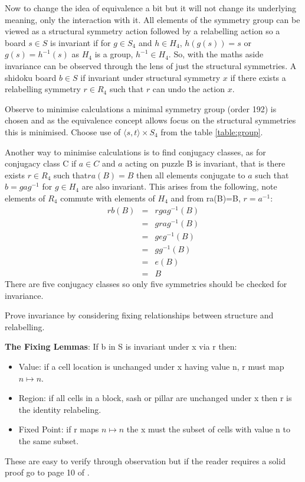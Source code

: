 \documentclass[a4paper,11pt]{report}
\begin{document}
Now to change the idea of equivalence a bit but it will not change its underlying meaning, only the interaction with it. All elements of the symmetry group can be viewed as a structural symmetry action followed by a relabelling action so a board $s\in S$ is invariant if for $g\in S_4$ and $h\in H_4$, $h(g(s))=s$ or $g(s)=h^{-1}(s)$ as $H_4 $ is a group, $h^{-1}\in H_4$. So, with the maths aside invariance can be observed through the lens of just the structural symmetries. A shidoku board $b\in S$ if invariant under structural symmetry $x$ if there exists a relabelling symmetry $r\in R_4$ such that $r$ can undo the action $x$.

Observe to minimise calculations a minimal symmetry group (order 192) is chosen and as the equivalence concept allows focus on the structural symmetries this is minimised. Choose use of $\langle s,t \rangle \times S_4$ from the table \ref{table:group}.

Another way to minimise calculations is to find conjugacy classes, as for conjugacy class C if $a\in C$ and $a$ acting on puzzle B is invariant, that is there exists $r\in R_4$ such that$ra(B)=B$ then all elements conjugate to $a$ such that $b=gag^{-1}$ for $g\in H_4$ are also invariant. This arises from the following, note elements of $R_4$ commute with elements of $H_4$ and from ra(B)=B, $r=a^{-1}$:
\begin{eqnarray}
rb(B)&=&rgag^{-1}(B)\\
&=&grag^{-1}(B)\\
&=&geg^{-1}(B)\\
&=&gg^{-1}(B)\\
&=&e(B)\\
&=&B
\end{eqnarray}
There are five conjugacy classes so only five symmetries should be checked for invariance. 

Prove invariance by considering fixing relationships between structure and relabelling. 

\textbf{The Fixing Lemmas}: If b in S is invariant under x via r then:
\begin{itemize}
\item Value: if a cell location is unchanged under x having value n, r must map $n \mapsto n$.
\item Region: if all cells in a block, sash or pillar are unchanged under x then r is the identity relabeling. 
\item Fixed Point: if r maps $n\mapsto n$ the x must the subset of cells with value n to the same subset.
\end{itemize}
These are easy to verify through observation but if the reader requires a solid proof go to page 10 of \cite{arnold2013minimal}.
\end{document}
